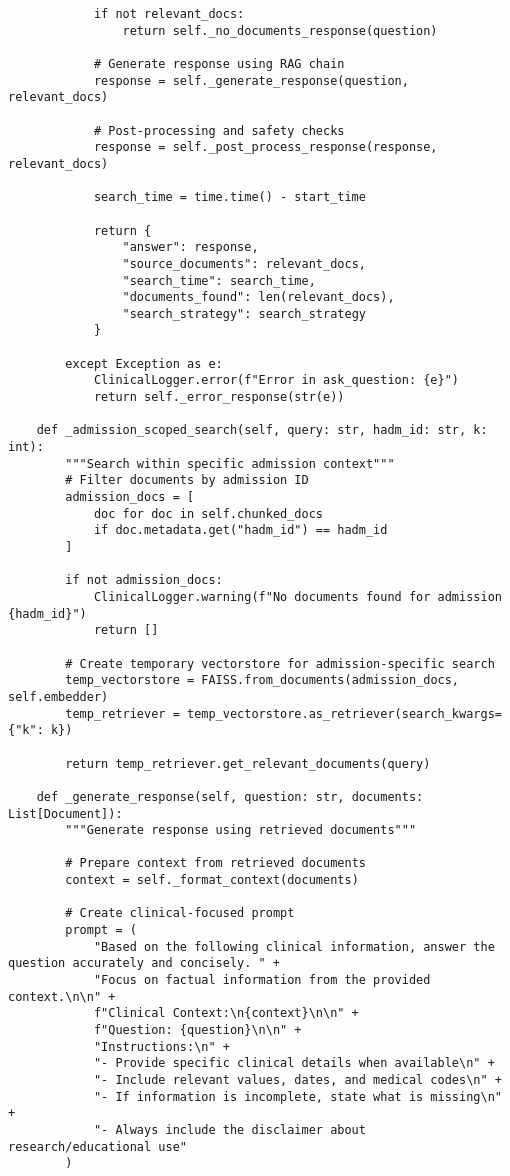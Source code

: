\begin{verbatim}
            if not relevant_docs:
                return self._no_documents_response(question)
            
            # Generate response using RAG chain
            response = self._generate_response(question, relevant_docs)
            
            # Post-processing and safety checks
            response = self._post_process_response(response, relevant_docs)
            
            search_time = time.time() - start_time
            
            return {
                "answer": response,
                "source_documents": relevant_docs,
                "search_time": search_time,
                "documents_found": len(relevant_docs),
                "search_strategy": search_strategy
            }
        
        except Exception as e:
            ClinicalLogger.error(f"Error in ask_question: {e}")
            return self._error_response(str(e))
    
    def _admission_scoped_search(self, query: str, hadm_id: str, k: int):
        """Search within specific admission context"""
        # Filter documents by admission ID
        admission_docs = [
            doc for doc in self.chunked_docs 
            if doc.metadata.get("hadm_id") == hadm_id
        ]
        
        if not admission_docs:
            ClinicalLogger.warning(f"No documents found for admission {hadm_id}")
            return []
        
        # Create temporary vectorstore for admission-specific search
        temp_vectorstore = FAISS.from_documents(admission_docs, self.embedder)
        temp_retriever = temp_vectorstore.as_retriever(search_kwargs={"k": k})
        
        return temp_retriever.get_relevant_documents(query)
    
    def _generate_response(self, question: str, documents: List[Document]):
        """Generate response using retrieved documents"""
        
        # Prepare context from retrieved documents
        context = self._format_context(documents)
        
        # Create clinical-focused prompt
        prompt = (
            "Based on the following clinical information, answer the question accurately and concisely. " +
            "Focus on factual information from the provided context.\n\n" +
            f"Clinical Context:\n{context}\n\n" +
            f"Question: {question}\n\n" +
            "Instructions:\n" +
            "- Provide specific clinical details when available\n" +
            "- Include relevant values, dates, and medical codes\n" +
            "- If information is incomplete, state what is missing\n" +
            "- Always include the disclaimer about research/educational use"
        )
        

\end{verbatim}
